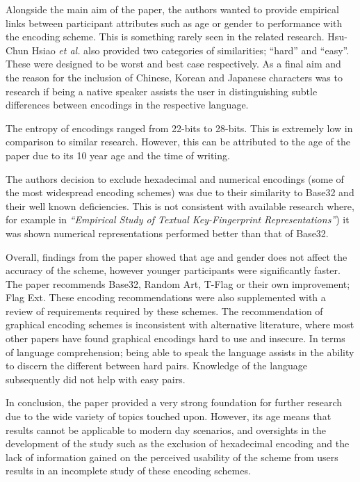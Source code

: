 Alongside the main aim of the paper, the authors wanted to provide empirical links between participant attributes such as age or gender to performance with the encoding scheme. This is something rarely seen in the related research. Hsu-Chun Hsiao \textit{et al.} also provided two categories of similarities; ``hard'' and ``easy''. These were designed to be worst and best case respectively. As a final aim and the reason for the inclusion of Chinese, Korean and Japanese characters was to research if being a native speaker assists the user in distinguishing subtle differences between encodings in the respective language.

The entropy of encodings ranged from 22-bits to 28-bits. This is extremely low in comparison to similar research. However, this can be attributed to the age of the paper due to its 10 year age and the time of writing. 

The authors decision to exclude hexadecimal and numerical encodings (some of the most widespread encoding schemes) was due to their similarity to Base32 and their well known deficiencies. This is not consistent with available research where, for example in \textit{``Empirical Study of Textual Key-Fingerprint Representations''}) it was shown numerical representations performed better than that of Base32.

Overall, findings from the paper showed that age and gender does not affect the accuracy of the scheme, however younger participants were significantly faster. \\
The paper recommends Base32, Random Art, T-Flag or their own improvement; Flag Ext. These encoding recommendations were also supplemented with a review of requirements required by these schemes. The recommendation of graphical encoding schemes is inconsistent with alternative literature, where most other papers have found graphical encodings hard to use and insecure.
In terms of language comprehension; being able to speak the language assists in the ability to discern the different between hard pairs. Knowledge of the language subsequently did not help with easy pairs.

In conclusion, the paper provided a very strong foundation for further research due to the wide variety of topics touched upon. However, its age means that results cannot be applicable to modern day scenarios, and oversights in the development of the study such as the exclusion of hexadecimal encoding and the lack of information gained on the perceived usability of the scheme from users results in an incomplete study of these encoding schemes. 

